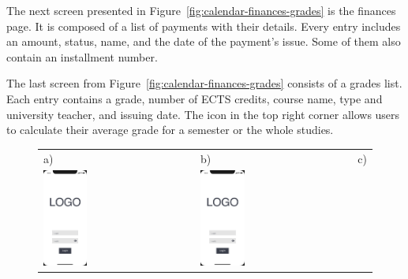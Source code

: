 The next screen presented in Figure~\ref{fig:calendar-finances-grades} is the finances page. It is composed of a list of payments with their details. Every entry includes an amount, status, name, and the date of the payment's issue. Some of them also contain an installment number.

The last screen from Figure~\ref{fig:calendar-finances-grades} consists of a grades list. Each entry contains a grade, number of ECTS credits, course name, type and university teacher, and issuing date. The icon in the top right corner allows users to calculate their average grade for a semester or the whole studies.

\begin{figure}[htb]
    \centering
    \begin{tabular}{@{}lll@{}}
        a) & b) & c) \\
        \includegraphics[page=2,width=0.300\textwidth]{fig04/jsos_helper_wireframe.pdf} &
        \includegraphics[page=6,width=0.300\textwidth]{fig04/jsos_helper_wireframe.pdf} &

\end{tabular}
\end{figure}

